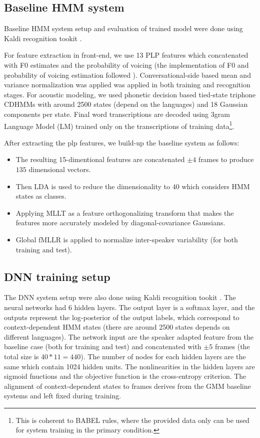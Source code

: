 \documentclass{article}
\begin{document}
\subsection{Baseline HMM system}
\label{baseline}
Baseline HMM system setup and evaluation of trained model were done using Kaldi recognition tookit \cite{Kaldi}. 

For feature extraction in front-end, we use 13 PLP features which concatenated with F0 estimates and the probability of voicing (the implementation of F0 and probability of voicing estimation followed \cite{F0}). Conversational-side based mean and variance normalization was applied was applied in both training and recognition stages. For acoustic modeling, we used phonetic decision based tied-state triphone CDHMMs with around 2500 states (depend on the languages) and 18 Gaussian components per state. Final word transcriptions are decoded using 3gram Language Model (LM) trained only on the transcriptions of training
data\footnote{This is coherent to BABEL rules, where the provided data only can be used for system training in the primary condition.}.

After extracting the plp features, we build-up the baseline system as follows:
\begin{itemize}
  \item The resulting 15-dimentional features are concatenated $\pm 4$ frames to produce $135$ dimensional vectors.
  \item Then LDA is used to reduce the dimensionality to $40$ which considers HMM states as classes. 
  \item Applying MLLT \cite{MLLT} as a feature orthogonalizing transform that makes the features more accurately modeled by diagonal-covariance Gaussians.
  \item Global fMLLR \cite{fmllr} is applied to normalize inter-speaker variability (for both training and test).
\end{itemize}

\subsection{DNN training setup}
The DNN system setup were also done using Kaldi recognition tookit \cite{Kaldi}. The neural networks had 6 hidden layers. The output layer is a softmax layer, and the outputs represent the log-posterior of the output labels, which correspond to context-dependent HMM states (there are around 2500 states depends on different languages). The network input are the speaker adapted feature from the baseline case (both for training and test) and concatenated with $\pm 5$ frames (the
total size is $40*11=440$). The number of nodes for each hidden layers are the same which contain 1024 hidden units. The nonlinearities in the hidden layers are sigmoid fnuctions and the objective function is the cross-entropy criterion. The alignment of context-dependent states to frames derives from the GMM baseline systems and left fixed during training.
\end{document}
